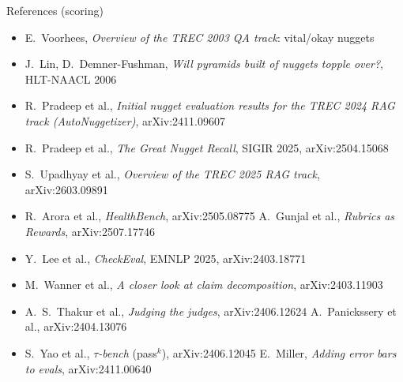 \begin{frame}{References (scoring)}
  \footnotesize
  \begin{itemize}
    \item E.\ Voorhees, \emph{Overview of the TREC 2003 QA track}: vital/okay nuggets
    \item J.\ Lin, D.\ Demner-Fushman, \emph{Will pyramids built of nuggets topple over?}, HLT-NAACL 2006
    \item R.\ Pradeep et al., \emph{Initial nugget evaluation results for the TREC 2024 RAG track (AutoNuggetizer)}, arXiv:2411.09607
    \item R.\ Pradeep et al., \emph{The Great Nugget Recall}, SIGIR 2025, arXiv:2504.15068
    \item S.\ Upadhyay et al., \emph{Overview of the TREC 2025 RAG track}, arXiv:2603.09891
    \item R.\ Arora et al., \emph{HealthBench}, arXiv:2505.08775 \quad A.\ Gunjal et al., \emph{Rubrics as Rewards}, arXiv:2507.17746
    \item Y.\ Lee et al., \emph{CheckEval}, EMNLP 2025, arXiv:2403.18771
    \item M.\ Wanner et al., \emph{A closer look at claim decomposition}, arXiv:2403.11903
    \item A.\ S.\ Thakur et al., \emph{Judging the judges}, arXiv:2406.12624 \quad A.\ Panickssery et al., arXiv:2404.13076
    \item S.\ Yao et al., \emph{$\tau$-bench} (pass$^k$), arXiv:2406.12045 \quad E.\ Miller, \emph{Adding error bars to evals}, arXiv:2411.00640
  \end{itemize}
\end{frame}

